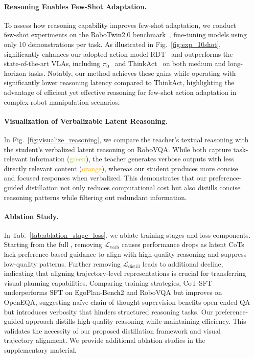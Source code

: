 \paragraph{Reasoning Enables Few-Shot Adaptation.}



To assess how reasoning capability improves few-shot adaptation, we conduct few-shot experiments on the RoboTwin2.0 benchmark~\cite{chen2025robotwin2}, fine-tuning models using only 10 demonstrations per task. As illustrated in Fig.~\ref{fig:exp_10shot}, \ours{} significantly enhances our adopted action model RDT~\cite{liu2024rdt} and outperforms the state-of-the-art VLAs, including $\pi_0$~\cite{black2024pi_0} and ThinkAct~\cite{huang2025thinkact} on both medium and long-horizon tasks. Notably, our method achieves these gains while operating with significantly lower reasoning latency compared to ThinkAct, highlighting the advantage of efficient yet effective reasoning for few-shot action adaptation in complex robot manipulation scenarios.

\paragraph{Visualization of Verbalizable Latent Reasoning.}
In Fig.~\ref{fig:visualize_reasoning}, we compare the teacher's textual reasoning with the student's verbalized latent reasoning on RoboVQA. While both capture task-relevant information (\textcolor{YellowGreen}{green}), the teacher generates verbose outputs with less directly relevant content (\textcolor{orange}{orange}), whereas our student produces more concise and focused responses when verbalized. This demonstrates that our preference-guided distillation not only reduces computational cost but also distills concise reasoning patterns while filtering out redundant information.


\paragraph{Ablation Study.}

In Tab.~\ref{tab:ablation_stage_loss}, we ablate training stages and loss components. Starting from the full \ours{}, removing $\mathcal{L}_\text{verb}$ causes performance drops as latent CoTs lack preference-based guidance to align with high-quality reasoning and suppress low-quality patterns. Further removing $\mathcal{L}_\text{distill}$ leads to additional decline, indicating that aligning trajectory-level representations is crucial for transferring visual planning capabilities. Comparing training strategies, CoT-SFT underperforms SFT on EgoPlan-Bench2 and RoboVQA but improves on OpenEQA, suggesting naïve chain-of-thought supervision benefits open-ended QA but introduces verbosity that hinders structured reasoning tasks. Our preference-guided approach distills high-quality reasoning while maintaining efficiency. This validates the necessity of our proposed distillation framework and visual trajectory alignment. We provide additional ablation studies in the supplementary material.

